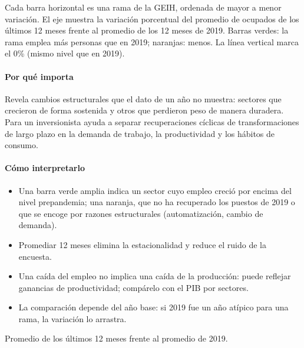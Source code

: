 \begin{leer}
Cada barra horizontal es una rama de la GEIH, ordenada de mayor a menor variación. El eje muestra la variación porcentual del promedio de ocupados de los últimos 12 meses frente al promedio de los 12 meses de 2019. Barras verdes: la rama emplea más personas que en 2019; naranjas: menos. La línea vertical marca el 0\% (mismo nivel que en 2019).
\end{leer}

\paragraph{Por qué importa}
Revela cambios estructurales que el dato de un año no muestra: sectores que crecieron de forma sostenida y otros que perdieron peso de manera duradera. Para un inversionista ayuda a separar recuperaciones cíclicas de transformaciones de largo plazo en la demanda de trabajo, la productividad y los hábitos de consumo.

\paragraph{Cómo interpretarlo}
\begin{itemize}
\item Una barra verde amplia indica un sector cuyo empleo creció por encima del nivel prepandemia; una naranja, que no ha recuperado los puestos de 2019 o que se encoge por razones estructurales (automatización, cambio de demanda).
\item Promediar 12 meses elimina la estacionalidad y reduce el ruido de la encuesta.
\item Una caída del empleo no implica una caída de la producción: puede reflejar ganancias de productividad; compárelo con el PIB por sectores.
\item La comparación depende del año base: si 2019 fue un año atípico para una rama, la variación lo arrastra.
\end{itemize}
\begin{formulas}[Fórmulas]
\end{formulas}
\begin{metodo}[Metodología]
Promedio de los últimos 12 meses frente al promedio de 2019.
\par{}
\end{metodo}

